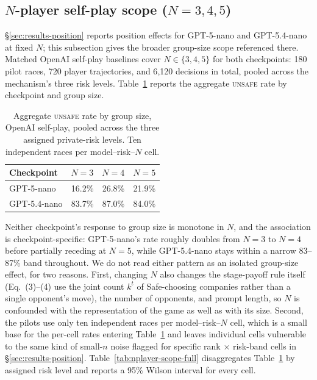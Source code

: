 \documentclass[sigconf]{aamas}
\newcommand{\Unsafe}{\textsc{unsafe}}
\begin{document}
\subsection{$N$-player self-play scope ($N=3,4,5$)}
\label{app:nplayer-scope}

\S\ref{sec:results-position} reports position effects for GPT-5-nano and
GPT-5.4-nano at fixed $N$; this subsection gives the broader group-size
scope referenced there. Matched OpenAI self-play baselines cover
$N\in\{3,4,5\}$ for both checkpoints: 180 pilot races, 720 player
trajectories, and 6{,}120 decisions in total, pooled across the mechanism's
three risk levels. Table~\ref{tab:nplayer-scope} reports the aggregate
\Unsafe{} rate by checkpoint and group size.

\begin{table}[h]
    \caption{Aggregate \Unsafe{} rate by group size, OpenAI self-play,
    pooled across the three assigned private-risk levels. Ten independent
    races per model--risk--$N$ cell.}
    \label{tab:nplayer-scope}
    \centering
    \small
    \begin{tabular}{@{}lrrr@{}}
        \toprule
        Checkpoint & $N=3$ & $N=4$ & $N=5$ \\
        \midrule
        GPT-5-nano    & 16.2\% & 26.8\% & 21.9\% \\
        GPT-5.4-nano  & 83.7\% & 87.0\%  & 84.0\% \\
        \bottomrule
    \end{tabular}
\end{table}

Neither checkpoint's response to group size is monotone in $N$, and the
association is checkpoint-specific: GPT-5-nano's rate roughly doubles from
$N=3$ to $N=4$ before partially receding at $N=5$, while GPT-5.4-nano stays
within a narrow 83--87\% band throughout. We do not read either pattern as
an isolated group-size effect, for two reasons. First, changing $N$ also
changes the stage-payoff rule itself (Eq.~(3)--(4) use the joint count
$k^t$ of Safe-choosing companies rather than a single opponent's move),
the number of opponents, and prompt length, so $N$ is confounded with the
representation of the game as well as with its size. Second, the pilots
use only ten independent races per model--risk--$N$ cell, which is a small
base for the per-cell rates entering Table~\ref{tab:nplayer-scope} and
leaves individual cells vulnerable to the same kind of small-$n$ noise
flagged for specific rank $\times$ risk-band cells in
\S\ref{sec:results-position}. Table~\ref{tab:nplayer-scope-full} disaggregates
Table~\ref{tab:nplayer-scope} by assigned risk level and reports a 95\%
Wilson interval for every cell.
\end{document}
